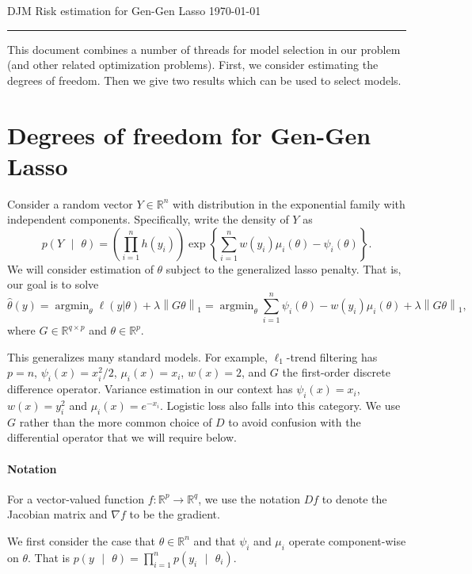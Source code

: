 \documentclass[11pt]{article}
\DeclareMathOperator*{\argmin}{argmin}
\newcommand{\norm}[1]{\left\lVert #1 \right\rVert}
\newcommand{\R}{\mathbb{R}}
\newcommand{\given}{\mbox{ }\vert\mbox{ }}
\renewcommand{\hat}{\widehat}
\theoremstyle{plain}
\newcommand{\makeHeader}{\begin{center} 
DJM \hfill Risk estimation for Gen-Gen Lasso \hfill \today


\rule{\textwidth}{1pt}
\end{center}
}
\begin{document}
\makeHeader


This document combines a number of threads for model selection in our
problem (and other related optimization problems). First, we consider
estimating the degrees of freedom. Then we give two results which can
be used to select models.

\section{Degrees of freedom for Gen-Gen Lasso}
\label{sec:degrees-freedom-gen}

Consider a random vector $Y \in \R^n$ with distribution in the
exponential family with independent
components. Specifically, write the density of $Y$ as
\begin{equation}
  \label{eq:4}
  p(Y \given \theta) = \left(\prod_{i=1}^n h(y_i)\right)\exp\left\{
    \sum_{i=1}^n w(y_i) \mu_i(\theta) -\psi_i(\theta) \right\}.
\end{equation}
We will consider estimation of $\theta$ subject to the generalized lasso penalty. That is,
our goal is to solve 
\begin{equation}
  \label{eq:1}
  \hat\theta(y) = \argmin_\theta \ell(y | \theta) +
  \lambda\norm{G\theta}_1 = \argmin_\theta\sum_{i=1}^n \psi_i(\theta) - w(y_i)\mu_i(\theta) + \lambda\norm{G\theta}_1,
\end{equation}
where $G\in \R^{q\times p}$ and $\theta\in\R^p$.

This generalizes many standard models. For example,
$\ell_1$-trend filtering has $p=n$, $\psi_i(x) = x_i^2/2$,
$\mu_i(x)=x_i$, $w(x)=2$, and
$G$ the first-order discrete difference operator. Variance estimation
in our context has $\psi_i(x) = x_i$, $w(x) = y^2_i$ and $\mu_i(x) = e^{-x_i}$. Logistic loss also
falls into this category. We use $G$ rather than the more common
choice of $D$ to avoid confusion with the differential operator that
we will require below.

\paragraph{Notation} For a vector-valued function $f:\R^p\rightarrow
\R^q$, we use the notation $Df$ to denote the Jacobian matrix
and $\nabla f$ to be the gradient. 



We first consider the case that $\theta \in\R^n$ and that $\psi_i$ and
$\mu_i$ operate component-wise on
$\theta$. That is $p(y \given \theta) = \prod_{i=1}^n p(y_i \given \theta_i)$.
\end{document}
